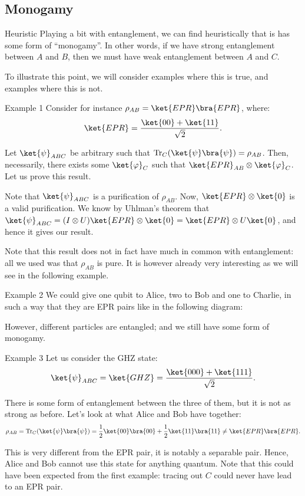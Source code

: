 \documentclass[a4paper]{article}
\begin{document}
\subsection{Monogamy}
 
\begin{parag}{Heuristic}
    Playing a bit with entanglement, we can find heuristically that is has some form of ``monogamy''. In other words, if we have strong entanglement between $A$ and $B$, then we must have weak entanglement between $A$ and $C$. 

    To illustrate this point, we will consider examples where this is true, and examples where this is not.

    \begin{subparag}{Example 1}
        Consider for instance $\rho_{AB} = \ket{EPR}\bra{EPR}$, where: 
        \[\ket{EPR}= \frac{\ket{00} + \ket{11}}{\sqrt{2}}.\]

        Let $\ket{\psi}_{ABC}$ be arbitrary such that $\Tr_C\left(\ket{\psi}\bra{\psi}\right) = \rho_{AB}$. Then, necessarily, there exists some $\ket{\phi}_C$ such that $\ket{EPR}_{AB} \otimes \ket{\phi}_C$. Let us prove this result.

        Note that $\ket{\psi}_{ABC}$ is a purification of $\rho_{AB}$. Now, $\ket{EPR} \otimes \ket{0}$ is a valid purification. We know by Uhlman's theorem that $\ket{\psi}_{ABC} = \left(I \otimes U\right) \ket{EPR} \otimes \ket{0} = \ket{EPR} \otimes U \ket{0}$, and hence it gives our result.

        Note that this result does not in fact have much in common with entanglement: all we used was that $\rho_{AB}$ is pure. It is however already very interesting as we will see in the following example.
    \end{subparag}

    \begin{subparag}{Example 2}
        We could give one qubit to Alice, two to Bob and one to Charlie, in such a way that they are EPR pairs like in the following diagram:

        However, different particles are entangled; and we still have some form of monogamy.
    \end{subparag}

    \begin{subparag}{Example 3}
        Let us consider the GHZ state:
        \[\ket{\psi}_{ABC} = \ket{GHZ} = \frac{\ket{000} + \ket{111}}{\sqrt{2}}.\]
        
        There is some form of entanglement between the three of them, but it is not as strong as before. Let's look at what Alice and Bob have together: 
        \[\rho_{AB} = \Tr_C\left(\ket{\psi}\bra{\psi}\right) = \frac{1}{2} \ket{00}\bra{00} + \frac{1}{2} \ket{11} \bra{11} \neq \ket{EPR}\bra{EPR}.\]
        
        This is very different from the EPR pair, it is notably a separable pair. Hence, Alice and Bob cannot use this state for anything quantum. Note that this could have been expected from the first example: tracing out $C$ could never have lead to an EPR pair.
    \end{subparag}
\end{parag}
\end{document}

